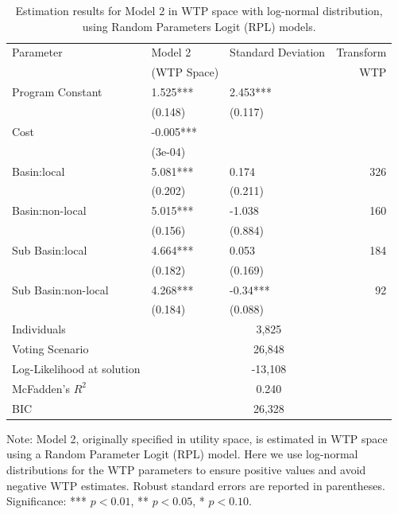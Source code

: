 {
\renewcommand{\thetable}{A2} %

\begin{table}[ht]
\caption{Estimation results for Model 2 in WTP space with log-normal distribution, using Random Parameters Logit (RPL) models.}\label{A3.4}

\centering
\begin{tabular}{lllr}
  \midrule
Parameter & Model 2  & Standard Deviation & Transform \\ 
 & (WTP Space) &  &  WTP \\ 

  \midrule
Program Constant & 1.525*** & 2.453*** &  \\ 
   & (0.148) & (0.117) &  \\ 
  Cost & -0.005*** &  &  \\ 
   & (3e-04) &  &  \\ 
  Basin:local & 5.081*** & 0.174 & 326 \\ 
   & (0.202) & (0.211) &  \\ 
  Basin:non-local & 5.015*** & -1.038 & 160 \\ 
   & (0.156) & (0.884) &  \\ 
  Sub Basin:local & 4.664*** & 0.053 & 184 \\ 
   & (0.182) & (0.169) &  \\ 
  Sub Basin:non-local & 4.268*** & -0.34*** & 92 \\ 
   & (0.184) & (0.088) &  \\ 
\midrule
Individuals & \multicolumn{3}{c}{3,825}  \\ 
Voting Scenario & \multicolumn{3}{c}{26,848}  \\    
Log-Likelihood at solution & \multicolumn{3}{c}{-13,108}  \\  
McFadden's $R^2$ & \multicolumn{3}{c}{0.240} \\
BIC & \multicolumn{3}{c}{26,328}  \\    
\midrule
\end{tabular}
\begin{minipage}{15cm}
\footnotesize
Note: Model 2, originally specified in utility space, is estimated in WTP space using a Random Parameter Logit (RPL) model. 
Here we use log-normal distributions for the WTP parameters to ensure positive values and avoid negative WTP estimates.
Robust standard errors are reported in parentheses. 
Significance: *** $p < 0.01$, ** $p < 0.05$, * $p < 0.10$.
\end{minipage}
\end{table}
}
